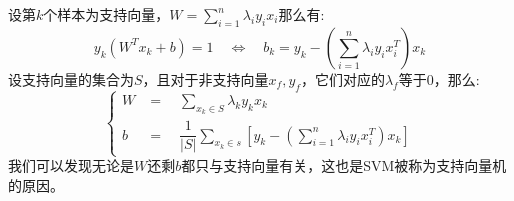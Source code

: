 \documentclass[withoutpreface,bwprint]{cumcmthesis} %
\begin{document}
	设第$k$个样本为支持向量，$W=\sum_{i=1}^{n}\lambda_iy_ix_i$那么有:
	\begin{equation*}
		y_k(W^Tx_k+b)=1 \quad \Longleftrightarrow \quad b_k=y_k-(\sum_{i=1}^{n}\lambda_iy_ix_i^T)x_k
	\end{equation*}
	设支持向量的集合为$S$，且对于非支持向量$x_f,y_f$，它们对应的$\lambda_f$等于0，那么:
	\begin{equation}
		\begin{cases}
			W & =\quad \sum_{x_k \in S} \lambda_ky_kx_k  \\
			b & =\quad \dfrac{1}{|S|}\sum_{x_k \in s} \left[ y_k-(\sum_{i=1}^{n}\lambda_iy_ix_i^T)x_k \right]
		\end{cases}
	\end{equation}
	我们可以发现无论是$W$还剩$b$都只与支持向量有关，这也是SVM被称为支持向量机的原因。
	
\end{document}
